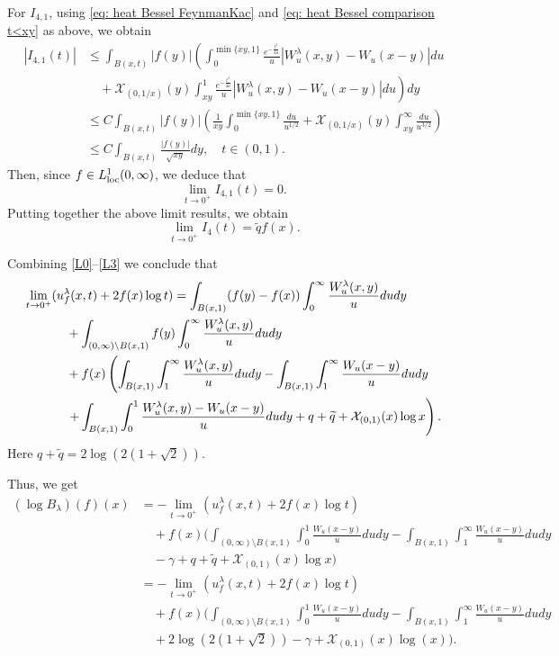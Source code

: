 \documentclass[a4paper,10pt, reqno]{amsart}
\theoremstyle{definition}
\theoremstyle{remark}
\numberwithin{equation}{section}
\begin{document}
For $I_{4,1}$, using \eqref{eq: heat Bessel FeynmanKac} and \eqref{eq: heat Bessel comparison t<xy} as above, we obtain
\begin{align*}
    |I_{4,1}(t)|&\leq \int_{B(x,t)}|f(y)|\left(\int_0^{\min\{xy,1\}}\frac{e^{-\frac{t^2}{4u}}}{u}|W_u^\lambda (x,y)-W_u(x-y)|du\right.\\
    &\quad +\left.\mathcal X_{(0,1/x)}(y)\int_{xy}^1\frac{e^{-\frac{t^2}{4u}}}{u}|W_u^\lambda (x,y)-W_u(x-y)|du\right)dy\\
    &\leq C\int_{B(x,t)}|f(y)|\left(\frac{1}{xy}\int_0^{\min\{xy,1\}}\frac{du}{u^{1/2}}+\mathcal X_{(0,1/x)}(y)\int_{xy}^\infty \frac{du}{u^{3/2}}\right)\\
    &\leq C\int_{B(x,t)}\frac{|f(y)|}{\sqrt{xy}}dy,\quad t\in (0,1).
\end{align*}
Then, since $f\in L^1_{\rm loc}(0,\infty)$, we deduce that
\[
\lim_{t\rightarrow 0^+}I_{4,1}(t)=0.
\]
Putting together the above limit results, we obtain
\begin{equation}\label{L3}
\lim_{t\rightarrow 0^+}I_4(t)=\widetilde{q}f(x).
\end{equation}

Combining \eqref{L0}--\eqref{L3} we conclude that
\begin{align*}
\lim_{t\rightarrow 0^+}(u_f^\lambda (x,t)+2f(x)\log t)
&=\int_{B(x,1)}(f(y)-f(x))\int_0^\infty \frac{W_u^\lambda (x,y)}{u}dudy\\
&\hspace{-3cm}+\int_{(0,\infty)\setminus B(x,1)}f(y)\int_0^\infty \frac{W_u^\lambda (x,y)}{u}dudy\\
&\hspace{-3cm}+f(x)\left(\int_{B(x,1)}\int_1^\infty \frac{W_u^\lambda (x,y)}{u}dudy-\int_{B(x,1)}\int_1^\infty \frac{W_u(x-y)}{u}dudy\right.\\
&\hspace{-3cm}\left.+\int_{B(x,1)}\int_0^1\frac{W_u^\lambda (x,y)-W_u(x-y)}{u}dudy+q+\widetilde{q}+\mathcal X_{(0,1)}(x)\log x\right).
\end{align*}
Here $q+\tilde{q}=2\log(2(1+\sqrt{2}))$.

Thus, we get
\begin{align*}
(\log B_\lambda)(f)(x)&=-\lim_{t\rightarrow 0^+}(u_f^\lambda (x,t)+2f(x)\log t)\\
&\quad +f(x)\Bigg(\int_{(0,\infty)\setminus B(x,1)}\int_0^1\frac{W_u(x-y)}{u}dudy-\int_{B(x,1)}\int_1^\infty \frac{W_u (x-y)}{u}dudy\\
&\quad -\gamma+q+\widetilde{q}+\mathcal X_{(0,1)}(x)\log x\Bigg)\\
&=-\lim_{t\rightarrow 0^+}(u_f^\lambda (x,t)+2f(x)\log t)\\
&\quad +f(x)\Big(\int_{(0,\infty)\setminus B(x,1)}\int_0^1\frac{W_u(x-y)}{u}dudy-\int_{B(x,1)}\int_1^\infty \frac{W_u (x-y)}{u}dudy\\
&\quad +2\log(2(1+\sqrt{2}))-\gamma+\mathcal X_{(0,1)}(x)\log(x)\Big).
\end{align*}
\end{document}
